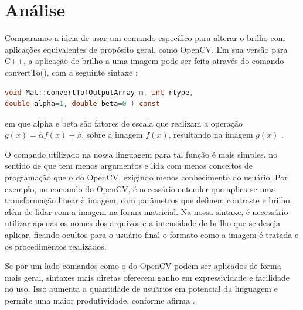 \documentclass[a4paper, 10pt, conference]{ieeeconf}
\begin{document}
\section{Análise}


Comparamos a ideia de usar um comando específico para alterar o brilho com aplicações equivalentes de propósito geral, como OpenCV. Em sua versão para C++, a aplicação de brilho a uma imagem pode ser feita através do comando convertTo(), com a seguinte sintaxe \cite{opencv2}:
\begin{lstlisting}[language=C, basicstyle=\footnotesize]
void Mat::convertTo(OutputArray m, int rtype, 
double alpha=1, double beta=0 ) const
\end{lstlisting}
em que alpha e beta são fatores de escala que realizam a operação $g(x)=\alpha f(x) + \beta$, sobre a imagem $f(x)$, resultando na imagem $g(x)$ \cite{opencv}.

O comando utilizado na nossa linguagem para tal função é mais simples, no sentido de que tem menos argumentos e lida com menos conceitos de programação que o do OpenCV, exigindo menos conhecimento do usuário. Por exemplo, no comando do OpenCV, é necessário entender que aplica-se uma transformação linear à imagem, com parâmetros que definem contraste e brilho, além de lidar com a imagem na forma matricial. Na nossa sintaxe, é necessário utilizar apenas os nomes dos arquivos e a intensidade de brilho que se deseja aplicar, ficando ocultos para o usuário final o formato como a imagem é tratada e os procedimentos realizados.

Se por um lado comandos como o do OpenCV podem ser aplicados de forma mais geral, sintaxes mais diretas oferecem ganho em expressividade e facilidade no uso. Isso aumenta a quantidade de usuários em potencial da linguagem e permite uma maior produtividade, conforme afirma \cite{dsl}.
\end{document}
